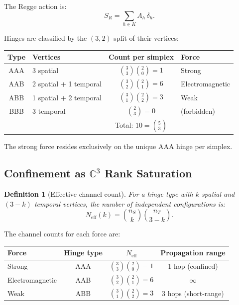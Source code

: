 \documentclass[12pt]{article}
\newtheorem{definition}[theorem]{Definition}
\theoremstyle{remark}
\theoremstyle{definition}
\newcommand{\CC}{\mathbb{C}}
\begin{document}
\noindent
The Regge action \cite{Regge} is:
\begin{equation}
\boxed{S_R = \sum_{h \in K} A_h\, \delta_h.}
\label{eq:Regge_YM}
\end{equation}

Hinges are classified by the $(3,2)$ split of their vertices:

\begin{center}
\begin{tabular}{clcl}
\hline
Type & Vertices & Count per simplex & Force \\
\hline
AAA & 3 spatial & $\binom{3}{3}\binom{2}{0} = 1$ & Strong \\
AAB & 2 spatial $+$ 1 temporal & $\binom{3}{2}\binom{2}{1} = 6$ &
  Electromagnetic \\
ABB & 1 spatial $+$ 2 temporal & $\binom{3}{1}\binom{2}{2} = 3$ &
  Weak \\
BBB & 3 temporal & $\binom{2}{3} = 0$ & (forbidden) \\
\hline
& & Total: $10 = \binom{5}{3}$ & \\
\hline
\end{tabular}
\end{center}

\noindent
The strong force resides exclusively on the unique AAA hinge per simplex.

\subsection{Confinement as $\CC^3$ Rank Saturation}
\label{sec:confinement}

\begin{definition}[Effective channel count]
For a hinge type with $k$ spatial and $(3-k)$ temporal vertices, the
number of independent configurations is:
\begin{equation}
N_{\mathrm{eff}}(k) = \binom{n_S}{k} \binom{n_T}{3-k}.
\end{equation}
\end{definition}

\noindent
The channel counts for each force are:

\begin{center}
\begin{tabular}{lccc}
\hline
Force & Hinge type & $N_{\mathrm{eff}}$ & Propagation range \\
\hline
Strong & AAA & $\binom{3}{3}\binom{2}{0} = 1$ & 1 hop (confined) \\
Electromagnetic & AAB & $\binom{3}{2}\binom{2}{1} = 6$ & $\infty$ \\
Weak & ABB & $\binom{3}{1}\binom{2}{2} = 3$ & 3 hops (short-range) \\
\hline
\end{tabular}
\end{center}
\end{document}
